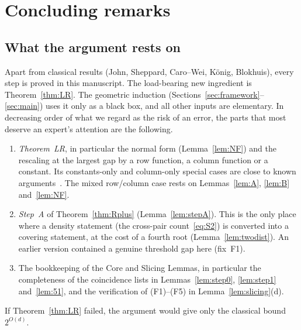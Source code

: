 \section{Concluding remarks}\label{sec:concl}

\subsection{What the argument rests on}
Apart from classical results (John, Sheppard, Caro--Wei, K\"onig, Blokhuis), every step is proved in this manuscript. The
load-bearing new ingredient is Theorem~\ref{thm:LR}. The geometric induction (Sections~\ref{sec:framework}--\ref{sec:main}) uses
it only as a black box, and all other inputs are elementary. In decreasing order of what we regard as the risk of an error,
the parts that most deserve an expert's attention are the following.
\begin{enumerate}[leftmargin=2em]
\item \emph{Theorem~LR}, in particular the normal form (Lemma~\ref{lem:NF}) and the rescaling at the largest gap by a row
  function, a column function or a constant. Its constants-only and column-only special cases are close to known
  arguments~\cite{Lovett,Rothvoss}. The mixed row/column case rests on Lemmas~\ref{lem:A}, \ref{lem:B} and~\ref{lem:NF}.
\item \emph{Step~A} of Theorem~\ref{thm:Rplus} (Lemma~\ref{lem:stepA}). This is the only place where a density statement (the
  cross-pair count~\eqref{eq:S2}) is converted into a covering statement, at the cost of a fourth root
  (Lemma~\ref{lem:twodist}). An earlier version contained a genuine threshold gap here (fix~F1).
\item The bookkeeping of the Core and Slicing Lemmas, in particular the completeness of the coincidence lists in
  Lemmas~\ref{lem:step0}, \ref{lem:step1} and~\ref{lem:51}, and the verification of (F1)--(F5) in Lemma~\ref{lem:slicing}(d).
\end{enumerate}
If Theorem~\ref{thm:LR} failed, the argument would give only the classical bound $2^{O(d)}$.

